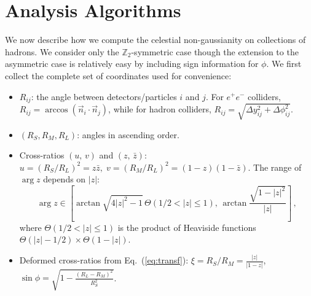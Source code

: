 \documentclass[letterpaper,11pt]{article}
\def\beq{\begin{equation}}
\def\eeq{\end{equation}}
\DeclareRobustCommand{\Eq}[1]{Eq.~(\ref{#1})}
\begin{document}
\section{Analysis Algorithms}
\label{sec:algorithm}


We now describe how we compute the celestial non-gaussianity on collections of hadrons.
%
We consider only the $\mathbb{Z}_2$-symmetric case though the extension to the asymmetric case is relatively easy by including sign information for $\phi$. 
%
We first collect the complete set of coordinates used for convenience:
%
\begin{itemize}
%
\item $R_{ij}$: the angle between detectors/particles $i$ and $j$.
For $e^+ e^-$ colliders, $R_{ij}=\arccos(\vec{n}_i\cdot \vec{n}_j)$, while for hadron colliders,  $R_{ij}=\sqrt{\Delta y_{ij}^2 +\Delta \phi_{ij}^2}$.
%
\item $(R_S, R_M, R_L)$: angles in ascending order.
%
\item Cross-ratios $(u,\,v)$ and $(z,\,\bar{z})$: $u=(R_S/R_L)^2=z\bar{z},\; v=(R_M/R_L)^2=(1-z)(1-\bar{z})$.
The range of $\arg z$ depends on $|z|$:  
\beq
\arg z \in \left[\arctan\sqrt{4|z|^2-1} \, \Theta(1/2<|z|\leq 1), \, \arctan \frac{\sqrt{1-|z|^2}}{|z|} \right]\,,
\eeq
where $\Theta(1/2<|z|\leq 1)$ is the product of Heaviside functions $\Theta(|z|-1/2) \times \Theta(1-|z|)$.
\item Deformed cross-ratios from \Eq{eq:transf}: $\xi = R_S/R_M = \frac{|z|}{|1-z|}$, $\sin\phi = \sqrt{1-\frac{(R_L-R_M)^2}{R_S^2}}$.
\end{itemize}
\end{document}
